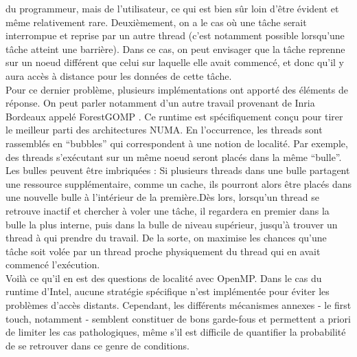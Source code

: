 \documentclass{report}
\begin{document}
du programmeur, mais de l'utilisateur, ce qui est bien sûr loin d'être évident et même relativement
rare. Deuxièmement, on a le cas où une tâche serait interrompue et reprise par un autre thread (c'est
notamment possible lorsqu'une tâche atteint une barrière). Dans ce cas, on peut envisager que la tâche
reprenne sur un noeud différent que celui sur laquelle elle avait commencé, et donc qu'il y aura accès 
à distance pour les données de cette tâche.
\\Pour ce dernier problème, plusieurs implémentations ont apporté des éléments de réponse. On peut
parler notamment d'un autre travail provenant de Inria Bordeaux appelé ForestGOMP \cite{forest}. Ce runtime
est spécifiquement conçu pour tirer le meilleur parti des architectures NUMA. En l'occurrence, les threads
sont rassemblés en ``bubbles'' qui correspondent à une notion de localité. Par exemple, des threads 
s'exécutant sur un même noeud seront placés dans la même ``bulle''. Les bulles peuvent être imbriquées : 
Si plusieurs threads dans une bulle partagent une ressource supplémentaire, comme un cache, ils pourront
alors être placés dans une nouvelle bulle à l'intérieur de la première.Dès lors, lorsqu'un thread se 
retrouve inactif et chercher à voler une tâche, il regardera en premier dans la bulle la plus interne,
puis dans la bulle de niveau supérieur, jusqu'à trouver un thread à qui prendre du travail. De la sorte,
on maximise les chances qu'une tâche soit volée par un thread proche physiquement du thread qui en avait
commencé l'exécution.
\\Voilà ce qu'il en est des questions de localité avec OpenMP. Dans le cas du runtime d'Intel, aucune 
stratégie spécifique n'est implémentée pour éviter les problèmes d'accès distants. Cependant, les différents
mécanismes annexes - le first touch, notamment - semblent constituer de bons garde-fous et permettent
a priori de limiter les cas pathologiques, même s'il est difficile de quantifier la probabilité de se
retrouver dans ce genre de conditions. 
\end{document}
